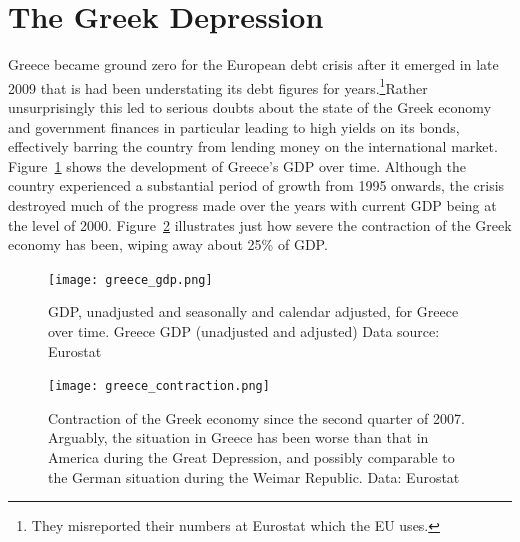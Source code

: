 \documentclass{tufte-handout}
\begin{document}
\section{The Greek Depression}
Greece became ground zero for the European debt crisis after it emerged in late 2009 that is had been understating its debt figures for years.\footnote{They misreported their numbers at Eurostat which the EU uses.}Rather unsurprisingly this led to serious doubts about the state of the Greek economy and government finances in particular leading to high yields on its bonds, effectively barring the country from lending money on the international market.  
Figure~\ref{fig:greece} shows the development of Greece's GDP over time. 
Although the country experienced a substantial period of growth from 1995 onwards, the crisis destroyed much of the progress made over the years with current GDP being at the level of 2000.
Figure~\ref{fig:contraction} illustrates just how severe the contraction of the Greek economy has been, wiping away about 25\% of GDP.
\begin{figure} \centering
    \texttt{[image: greece\_gdp.png]}
    \caption{GDP, unadjusted and seasonally and calendar adjusted, for Greece over time. Greece GDP (unadjusted and adjusted) Data source: Eurostat}
    \label{fig:greece}
\end{figure}
\begin{figure} \centering
    \texttt{[image: greece\_contraction.png]}
    \caption{Contraction of the Greek economy since the second quarter of 2007. Arguably, the situation in Greece has been worse than that in America during the Great Depression, and possibly comparable to the German situation during the Weimar Republic. Data: Eurostat}
    \label{fig:contraction}
\end{figure}
\end{document}
